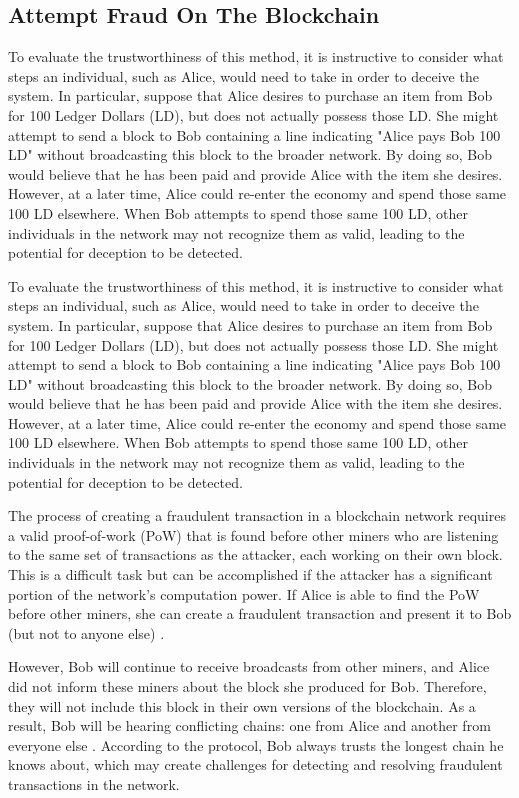 \subsection{Attempt Fraud On The Blockchain}
To evaluate the trustworthiness of this method, it is instructive to consider what steps an individual, such as Alice, would need to take
in order to deceive the system. In particular, suppose that Alice desires to purchase an item from Bob for 100 Ledger Dollars (LD), but
does not actually possess those LD. She might attempt to send a block to Bob containing a line indicating "Alice pays Bob 100 LD"
without broadcasting this block to the broader network. By doing so, Bob would believe that he has been paid and provide Alice with the
item she desires. However, at a later time, Alice could re-enter the economy and spend those same 100 LD elsewhere. When Bob attempts to
spend those same 100 LD, other individuals in the network may not recognize them as valid, leading to the potential for deception to be
detected.

To evaluate the trustworthiness of this method, it is instructive to consider what steps an individual, such as Alice, would need to take
in order to deceive the system. In particular, suppose that Alice desires to purchase an item from Bob for 100 Ledger Dollars (LD), but
does not actually possess those LD. She might attempt to send a block to Bob containing a line indicating "Alice pays Bob 100 LD"
without broadcasting this block to the broader network. By doing so, Bob would believe that he has been paid and provide Alice with the
item she desires. However, at a later time, Alice could re-enter the economy and spend those same 100 LD elsewhere. When Bob attempts to
spend those same 100 LD, other individuals in the network may not recognize them as valid, leading to the potential for deception to be
detected.

The process of creating a fraudulent transaction in a blockchain network requires a valid proof-of-work (PoW) that is found before other
miners who are listening to the same set of transactions as the attacker, each working on their own block. This is a difficult task but
can be accomplished if the attacker has a significant portion of the network's computation power. If Alice is able to find the PoW before
other miners, she can create a fraudulent transaction and present it to Bob (but not to anyone else) \cite{fang2022cryptocurrency}.

However, Bob will continue to receive broadcasts from other miners, and Alice did not inform these miners about the block she produced for
Bob. Therefore, they will not include this block in their own versions of the blockchain. As a result, Bob will be hearing conflicting
chains: one from Alice and another from everyone else \cite{TAN2022101625}. According to the protocol, Bob always trusts the longest
chain he knows about, which may create challenges for detecting and resolving fraudulent transactions in the network.

